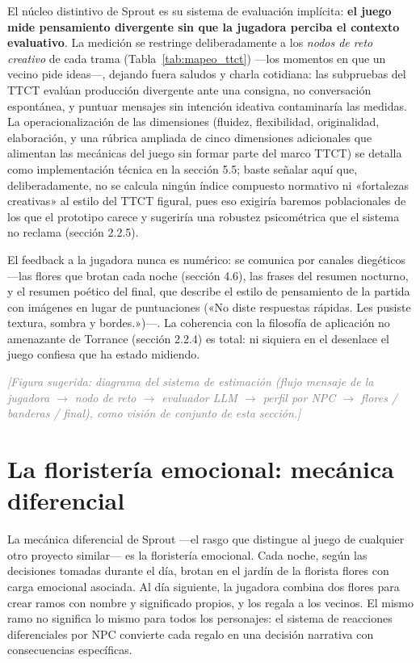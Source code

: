 \documentclass[12pt,twoside,titlepage]{report}
\begin{document}
El núcleo distintivo de Sprout es su sistema de evaluación implícita: \textbf{el juego mide pensamiento divergente sin que la jugadora perciba el contexto evaluativo}. La medición se restringe deliberadamente a los \textit{nodos de reto creativo} de cada trama (Tabla~\ref{tab:mapeo_ttct}) ---los momentos en que un vecino pide ideas---, dejando fuera saludos y charla cotidiana: las subpruebas del TTCT evalúan producción divergente ante una consigna, no conversación espontánea, y puntuar mensajes sin intención ideativa contaminaría las medidas. La operacionalización de las dimensiones (fluidez, flexibilidad, originalidad, elaboración, y una rúbrica ampliada de cinco dimensiones adicionales que alimentan las mecánicas del juego sin formar parte del marco TTCT) se detalla como implementación técnica en la sección 5.5; baste señalar aquí que, deliberadamente, no se calcula ningún índice compuesto normativo ni «fortalezas creativas» al estilo del TTCT figural, pues eso exigiría baremos poblacionales de los que el prototipo carece y sugeriría una robustez psicométrica que el sistema no reclama (sección 2.2.5).

El feedback a la jugadora nunca es numérico: se comunica por canales diegéticos ---las flores que brotan cada noche (sección 4.6), las frases del resumen nocturno, y el resumen poético del final, que describe el estilo de pensamiento de la partida con imágenes en lugar de puntuaciones («No diste respuestas rápidas. Les pusiste textura, sombra y bordes.»)---. La coherencia con la filosofía de aplicación no amenazante de Torrance (sección 2.2.4) es total: ni siquiera en el desenlace el juego confiesa que ha estado midiendo.

\textcolor{gray}{\textit{[Figura sugerida: diagrama del sistema de estimación (flujo mensaje de la jugadora $\rightarrow$ nodo de reto $\rightarrow$ evaluador LLM $\rightarrow$ perfil por NPC $\rightarrow$ flores / banderas / final), como visión de conjunto de esta sección.]}}

\section{La floristería emocional: mecánica diferencial}

La mecánica diferencial de Sprout ---el rasgo que distingue al juego de cualquier otro proyecto similar--- es la floristería emocional. Cada noche, según las decisiones tomadas durante el día, brotan en el jardín de la florista flores con carga emocional asociada. Al día siguiente, la jugadora combina dos flores para crear ramos con nombre y significado propios, y los regala a los vecinos. El mismo ramo no significa lo mismo para todos los personajes: el sistema de reacciones diferenciales por NPC convierte cada regalo en una decisión narrativa con consecuencias específicas.
\end{document}
